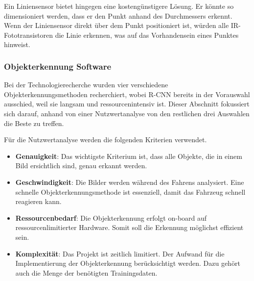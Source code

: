 \documentclass[../main.tex]{subfiles}
\begin{document}
Ein Liniensensor bietet hingegen eine kostengünstigere Lösung. Er könnte so dimensioniert werden, dass er den Punkt anhand des Durchmessers erkennt. Wenn der Liniensensor direkt über dem Punkt positioniert ist, würden alle IR-Fototransistoren die Linie erkennen, was auf das Vorhandensein eines Punktes hinweist.

\newpage

\subsubsection{Objekterkennung Software}
\label{a3:Objekterkennung}
Bei der Technologierecherche wurden vier verschiedene Objekterkennungsmethoden recherchiert, wobei R-CNN bereits in der Vorauswahl ausschied, weil sie langsam und ressourcenintensiv ist.
Dieser Abschnitt fokussiert sich darauf, anhand von einer Nutzwertanalyse von den restlichen drei Auswahlen die Beste zu treffen.

Für die Nutzwertanalyse werden die folgenden Kriterien verwendet.

\begin{itemize}
\item \textbf{Genauigkeit}: Das wichtigste Kriterium ist, dass alle Objekte, die in einem Bild ersichtlich sind, genau erkannt werden.
\item \textbf{Geschwindigkeit}: Die Bilder werden während des Fahrens analysiert. Eine schnelle Objekterkennungsmethode ist essenziell, damit das Fahrzeug schnell reagieren kann.
\item \textbf{Ressourcenbedarf}: Die Objekterkennung erfolgt on-board auf ressourcenlimitierter Hardware. Somit soll die Erkennung möglichst effizient sein.
\item \textbf{Komplexität}: Das Projekt ist zeitlich limitiert. Der Aufwand für die Implementierung der Objekterkennung berücksichtigt werden. Dazu gehört auch die Menge der benötigten Trainingsdaten.
\end{itemize}
\end{document}
